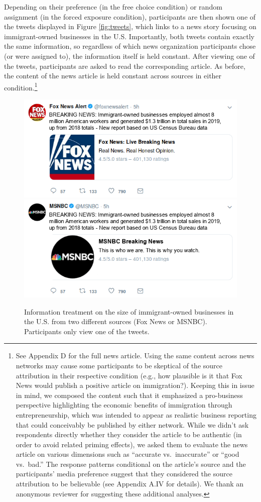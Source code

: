 \documentclass[
  12pt,
]{article}
\begin{document}
\noindent Depending on their preference (in the free choice condition)
or random assignment (in the forced exposure condition), participants
are then shown one of the tweets displayed in Figure \ref{fig:tweets},
which links to a news story focusing on immigrant-owned businesses in
the U.S. Importantly, both tweets contain exactly the same information,
so regardless of which news organization participants chose (or were
assigned to), the information itself is held constant. After viewing one
of the tweets, participants are asked to read the corresponding article.
As before, the content of the news article is held constant across
sources in either condition.\footnote{See Appendix D for the full news
  article. Using the same content across news networks may cause some
  participants to be skeptical of the source attribution in their
  respective condition (e.g., how plausible is it that Fox News would
  publish a positive article on immigration?). Keeping this in issue in
  mind, we composed the content such that it emphasized a pro-business
  perspective highlighting the economic benefits of immigration through
  entrepreneurship, which was intended to appear as realistic business
  reporting that could conceivably be published by either network. While
  we didn't ask respondents directly whether they consider the article
  to be authentic (in order to avoid related priming effects), we asked
  them to evaluate the news article on various dimensions such as
  ``accurate vs.~inaccurate'' or ``good vs.~bad.'' The response patterns
  conditional on the article's source and the participants' media
  preference suggest that they considered the source attribution to be
  believable (see Appendix A.IV for details). We thank an anonymous
  reviewer for suggesting these additional analyses.}

\singlespace

\begin{figure}
\includegraphics[width=0.5\linewidth]{../material/tweets/fox_popular} \includegraphics[width=0.5\linewidth]{../material/tweets/msnbc_popular} \caption{\label{fig:tweets}Information treatment on the size of immigrant-owned businesses in the U.S. from two different sources (Fox News or MSNBC). Participants only view one of the tweets.}\label{fig:fig_tweets}
\end{figure}
\end{document}
